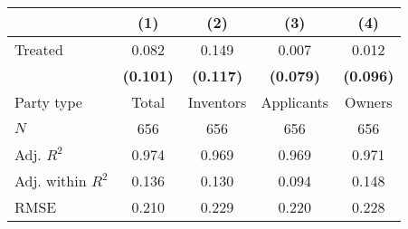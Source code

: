 
\begin{tabular}[t]{lcccc}
\toprule
  & (1) & (2) & (3) & (4)\\
\midrule
Treated & \num{0.082} & \num{0.149} & \num{0.007} & \num{0.012}\\
\textbf{} & \textbf{(\num{0.101})} & \textbf{(\num{0.117})} & \textbf{(\num{0.079})} & \textbf{(\num{0.096})}\\
\midrule
Party type & Total & Inventors & Applicants & Owners\\
$N$ & \num{656} & \num{656} & \num{656} & \num{656}\\
Adj. $R^2$ & \num{0.974} & \num{0.969} & \num{0.969} & \num{0.971}\\
Adj. within $R^2$ & \num{0.136} & \num{0.130} & \num{0.094} & \num{0.148}\\
RMSE & \num{0.210} & \num{0.229} & \num{0.220} & \num{0.228}\\
\bottomrule
\end{tabular}
